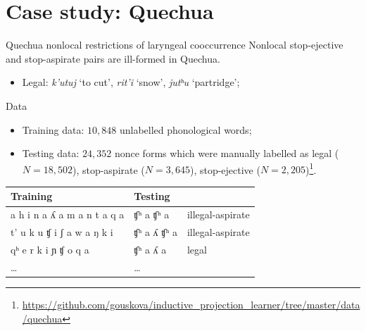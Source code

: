 \section{Case study: Quechua}

\begin{frame}{Quechua nonlocal restrictions of laryngeal cooccurrence}
     Nonlocal stop-ejective and stop-aspirate pairs are ill-formed in Quechua.
     \begin{itemize}
\item Legal: \textit{k'utuj} `to cut', \textit{rit'i} `snow', \textit{jutʰu} `partridge';

\end{itemize}
     

\end{frame}

\begin{frame}{Data}

\begin{itemize}
    \item Training data: $10,848$ unlabelled phonological words;
    \item Testing data: $24,352$ nonce forms which were manually labelled as legal ($N=18,502$), stop-aspirate ($N=3,645$), stop-ejective ($N=2,205$)\footnote{\url{https://github.com/gouskova/inductive_projection_learner/tree/master/data/quechua}}.
\end{itemize}    \vspace{-0.2cm}

    \begin{center}
        \begin{tabular}{lll}
        Training & Testing&\\\midrule        
        a h i n a ʎ a m a n t a q a & ʧʰ a ʧʰ a	& illegal-aspirate\\
        t' u k u ʧ i ʃ a w a ŋ k i  & ʧʰ a ʎ ʧʰ a	& illegal-aspirate\\
        qʰ e r k i ɲ ʧ o q a & ʧʰ a ʎ a &	legal\\
        \ldots & \ldots &
        \end{tabular}
    \end{center}
\hfill\small\citep{gouskova2019inducing}

\vspace{0.5cm}
\end{frame}

